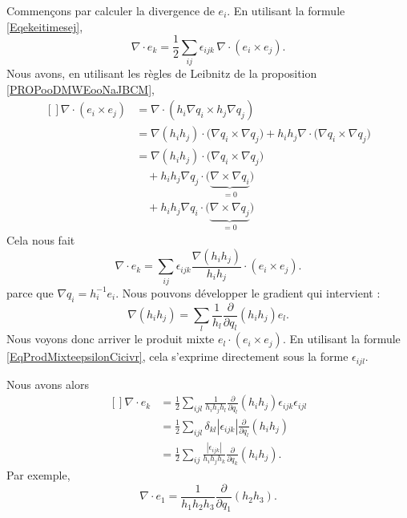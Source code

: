 Commençons par calculer la divergence de \( e_i\). En utilisant la formule \eqref{Eqekeitimesej},
\begin{equation}
	\nabla\cdot e_k=\frac{ 1 }{2}\sum_{ij}\epsilon_{ijk}\,\nabla\cdot (e_i\times e_j).
\end{equation}
Nous avons, en utilisant les règles de Leibnitz de la proposition \ref{PROPooDMWEooNaJBCM},
\begin{equation}
	\begin{aligned}[]
		\nabla\cdot(e_i\times e_j) & =\nabla\cdot(h_i\nabla q_i\times h_j\nabla q_j)                                                                    \\
		                           & =\nabla(h_ih_j)\cdot\big( \nabla q_i\times\nabla q_j \big)+h_ih_j\nabla\cdot\big( \nabla q_i\times\nabla q_j \big) \\
		                           & =\nabla(h_ih_j)\cdot\big( \nabla q_i\times\nabla q_j \big)                                                         \\
		                           & \quad+h_ih_j\nabla q_j\cdot\big( \underbrace{\nabla\times\nabla q_i}_{=0} \big)                                    \\
		                           & \quad+h_ih_j\nabla q_i\cdot\big( \underbrace{\nabla\times\nabla q_j}_{=0} \big)
	\end{aligned}
\end{equation}
Cela nous fait
\begin{equation}
	\nabla\cdot e_k=\sum_{ij}\epsilon_{ijk}\frac{ \nabla(h_ih_j) }{ h_ih_j }\cdot (e_i\times e_j).
\end{equation}
parce que \( \nabla q_i=h_i^{-1}e_i\). Nous pouvons développer le gradient qui intervient :
\begin{equation}
	\nabla(h_ih_j)=\sum_l\frac{1}{ h_l }\frac{ \partial  }{ \partial q_l }(h_ih_j)e_l.
\end{equation}
Nous voyons donc arriver le produit mixte \( e_l\cdot (e_i\times e_j)\). En utilisant la formule \eqref{EqProdMixteepsilonCicivr}, cela s'exprime directement sous la forme \( \epsilon_{ijl}\).

Nous avons alors
\begin{equation}        \label{EqFragradekdvi}
	\begin{aligned}[]
		\nabla\cdot e_k & =\frac{ 1 }{2}\sum_{ijl}\frac{1}{ h_ih_jh_l }\frac{ \partial  }{ \partial q_l }(h_ih_j)\epsilon_{ijk}\epsilon_{ijl} \\
		                & =\frac{ 1 }{2}\sum_{ijl}\delta_{kl}| \epsilon_{ijk} |\frac{ \partial  }{ \partial q_l }(h_ih_j)                     \\
		                & =\frac{ 1 }{2}\sum_{ij}\frac{| \epsilon_{ijk} |}{ h_ih_jh_k }\frac{ \partial  }{ \partial q_k }(h_ih_j).
	\end{aligned}
\end{equation}
Par exemple,
\begin{equation}
	\nabla\cdot e_1=\frac{1}{ h_1h_2h_3 }\frac{ \partial  }{ \partial q_1 }(h_2h_3).
\end{equation}

